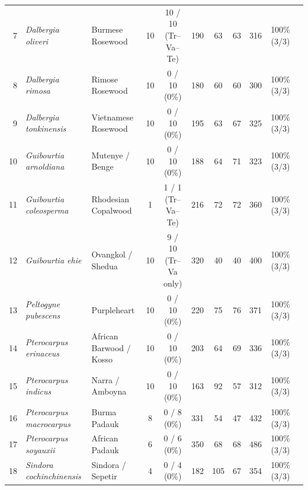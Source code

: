 \documentclass[a4paper,fleqn,12pt]{cas-sc}
\begin{document}
\begin{table}[pos=htbp]
{\begin{tabular}{rll c @{\hspace{10pt}} c ccccc r}
7 & \textit{Dalbergia oliveri} & Burmese Rosewood & 10 & \makecell{10 / 10\\\scriptsize (Tr--Va--Te)} & 190 & 63 & 63 & 316 & 100\% (3/3) \\
8 & \textit{Dalbergia rimosa} & Rimose Rosewood & 10 & \makecell{0 / 10\\\scriptsize (0\%)} & 180 & 60 & 60 & 300 & 100\% (3/3) \\
9 & \textit{Dalbergia tonkinensis} & Vietnamese Rosewood & 10 & \makecell{0 / 10\\\scriptsize (0\%)} & 195 & 63 & 67 & 325 & 100\% (3/3) \\
\midrule
10 & \textit{Guibourtia arnoldiana} & Mutenye / Benge & 10 & \makecell{0 / 10\\\scriptsize (0\%)} & 188 & 64 & 71 & 323 & 100\% (3/3) \\
11 & \textit{Guibourtia coleosperma} & Rhodesian Copalwood & 1 & \makecell{1 / 1\\\scriptsize (Tr--Va--Te)} & 216 & 72 & 72 & 360 & 100\% (3/3) \\
12 & \textit{Guibourtia ehie} & Ovangkol / Shedua & 10 & \makecell{9 / 10\\\scriptsize (Tr--Va only)} & 320 & 40 & 40 & 400 & 100\% (3/3) \\
\midrule
13 & \textit{Peltogyne pubescens} & Purpleheart & 10 & \makecell{0 / 10\\\scriptsize (0\%)} & 220 & 75 & 76 & 371 & 100\% (3/3) \\
\midrule
14 & \textit{Pterocarpus erinaceus} & African Barwood / Kosso & 10 & \makecell{0 / 10\\\scriptsize (0\%)} & 203 & 64 & 69 & 336 & 100\% (3/3) \\
15 & \textit{Pterocarpus indicus} & Narra / Amboyna & 10 & \makecell{0 / 10\\\scriptsize (0\%)} & 163 & 92 & 57 & 312 & 100\% (3/3) \\
16 & \textit{Pterocarpus macrocarpus} & Burma Padauk & 8 & \makecell{0 / 8\\\scriptsize (0\%)} & 331 & 54 & 47 & 432 & 100\% (3/3) \\
17 & \textit{Pterocarpus soyauxii} & African Padauk & 6 & \makecell{0 / 6\\\scriptsize (0\%)} & 350 & 68 & 68 & 486 & 100\% (3/3) \\
\midrule
18 & \textit{Sindora cochinchinensis} & Sindora / Sepetir & 4 & \makecell{0 / 4\\\scriptsize (0\%)} & 182 & 105 & 67 & 354 & 100\% (3/3) \\

\end{tabular}}
\end{table}
\end{document}
